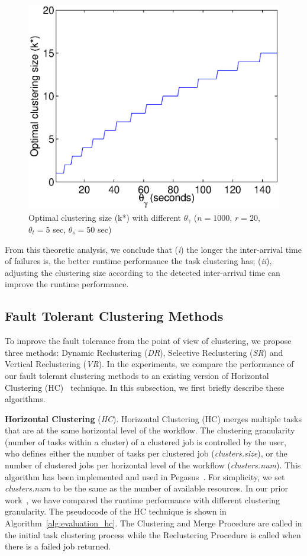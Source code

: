 \begin{figure}[!htb]
\centering
  \includegraphics[width=0.55\linewidth]{figures/tolerance/model_size.eps}
  \caption{Optimal clustering size (k*) with different  $\theta_{\gamma}$ ($n=1000$, $r=20$, $\theta_t=5$ sec, $\theta_s=50$ sec)}
  \label{fig:model_size}
\end{figure}


From this theoretic analysis, we conclude that (\emph{i}) the longer the inter-arrival time of failures is, the better runtime performance the task clustering has; (\emph{ii}), adjusting the clustering size according to the detected inter-arrival time can improve the runtime performance. 


\subsection{Fault Tolerant Clustering Methods}

To improve the fault tolerance from the point of view of clustering, we propose three methods: Dynamic Reclustering (\emph{DR}), Selective Reclustering (\emph{SR}) and Vertical Reclustering (\emph{VR}). In the experiments, we compare the performance of our fault tolerant clustering methods to an existing version of Horizontal Clustering (HC)~\cite{Singh2008} technique. In this subsection, we first briefly describe these algorithms.

\textbf{Horizontal Clustering} (\emph{HC}). 
Horizontal Clustering (HC) merges multiple tasks that are at the same horizontal level of the workflow. The clustering granularity (number of tasks within a cluster) of a clustered job is controlled by the user, who defines either the number of tasks per clustered job (\emph{clusters.size}), or the number of clustered jobs per horizontal level of the workflow (\emph{clusters.num}). This algorithm has been implemented and used in Pegasus~\cite{Singh2008}. For simplicity, we set \emph{clusters.num} to be the same as the number of available resources. In our prior work~\cite{Chen2013a,Chen2013b}, we have compared the runtime performance with different clustering granularity. The pseudocode of the HC technique is shown in Algorithm~\ref{alg:evaluation_hc}. The Clustering and Merge Procedure are called in the initial task clustering process while the Reclustering Procedure is called when there is a failed job returned. 

